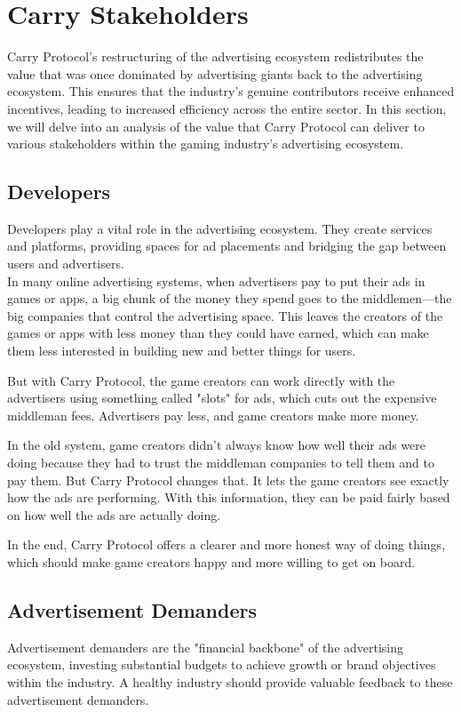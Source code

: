 \section{Carry Stakeholders}
Carry Protocol's restructuring of the advertising ecosystem redistributes the value that was once dominated by advertising giants back to the advertising ecosystem. This ensures that the industry's genuine contributors receive enhanced incentives, leading to increased efficiency across the entire sector. In this section, we will delve into an analysis of the value that Carry Protocol can deliver to various stakeholders within the gaming industry's advertising ecosystem.

\subsection{Developers}
Developers play a vital role in the advertising ecosystem. They create services and platforms, providing spaces for ad placements and bridging the gap between users and advertisers.\\


In many online advertising systems, when advertisers pay to put their ads in games or apps, a big chunk of the money they spend goes to the middlemen—the big companies that control the advertising space. This leaves the creators of the games or apps with less money than they could have earned, which can make them less interested in building new and better things for users.

But with Carry Protocol, the game creators can work directly with the advertisers using something called "slots" for ads, which cuts out the expensive middleman fees. Advertisers pay less, and game creators make more money.

In the old system, game creators didn't always know how well their ads were doing because they had to trust the middleman companies to tell them and to pay them. But Carry Protocol changes that. It lets the game creators see exactly how the ads are performing. With this information, they can be paid fairly based on how well the ads are actually doing.

In the end, Carry Protocol offers a clearer and more honest way of doing things, which should make game creators happy and more willing to get on board.

\subsection{Advertisement Demanders}
Advertisement demanders are the "financial backbone" of the advertising ecosystem, investing substantial budgets to achieve growth or brand objectives within the industry. A healthy industry should provide valuable feedback to these advertisement demanders.\\

